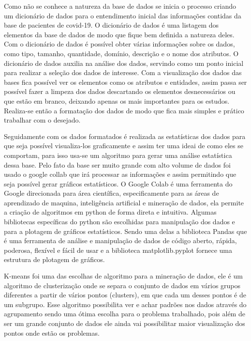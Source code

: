 \documentclass[tcc1]{uftex}
\begin{document}
Como não se conhece a natureza da base de dados se inicia o processo criando um dicionário de dados para o entendimento inicial das informações contidas da base de pacientes de covid-19.  O dicionário de dados é uma listagem dos elementos da base de dados de modo que fique bem definida a natureza deles. Com o dicionário de dados é possível obter várias informações sobre os dados, como tipo, tamanho, quantidade, domínio, descrição e o nome dos atributos. O dicionário de dados auxilia na análise dos dados, servindo como um ponto inicial para realizar a seleção dos dados de interesse. Com a visualização dos dados das bases fica possível ver os elementos como os atributos e entidades, assim passa ser possível fazer a limpeza dos dados descartando os elementos desnecessários ou que estão em branco, deixando apenas os mais importantes para os estudos. Realiza-se então a formatação dos dados de modo que fica mais simples e prático trabalhar com o desejado.
	
	
	Seguidamente com os dados formatados é realizada as estatísticas dos dados para que seja possível visualiza-los graficamente e assim ter uma ideai de como eles se comportam, para isso usa-se um algoritmo para gerar uma análise estatística dessa base. Pelo fato da base ser muito grande com alto volume de dados foi usado o google collab que irá processar as informações e assim permitindo que seja possível gerar gráficos estatísticos. O Google Colab é uma ferramenta do Google direcionada para área científica, especificamente para as áreas de aprendizado de maquina, inteligência artificial e mineração de dados, ela permite a criação de algoritmos em python de forma direta e intuitiva. Algumas bibliotecas específicas do python são escolhidas para manipulação dos dados e para a plotagem de gráficos estatísticos. Sendo uma delas a biblioteca Pandas que é uma ferramenta de análise e manipulação de dados de código aberto, rápida, poderosa, flexível e fácil de usar e a biblioteca matplotlib.pyplot fornece uma estrutura de plotagem de gráficos.
	
	
	K-means foi uma das escolhas de algoritmo para a mineração de dados, ele é um algoritmo de clusterização onde se separa o conjunto de dados em vários grupos diferentes a partir de vários pontos (clusters), em que cada um desses pontos é de um subgrupo. Esse algoritmo possibilita ver e achar padrões nos dados através do agrupamento sendo uma ótima escolha para o problema trabalhado, pois além de ser um grande conjunto de dados ele ainda vai possibilitar maior visualização dos pontos onde estão os problemas.\cite{kmeans}
\end{document}

